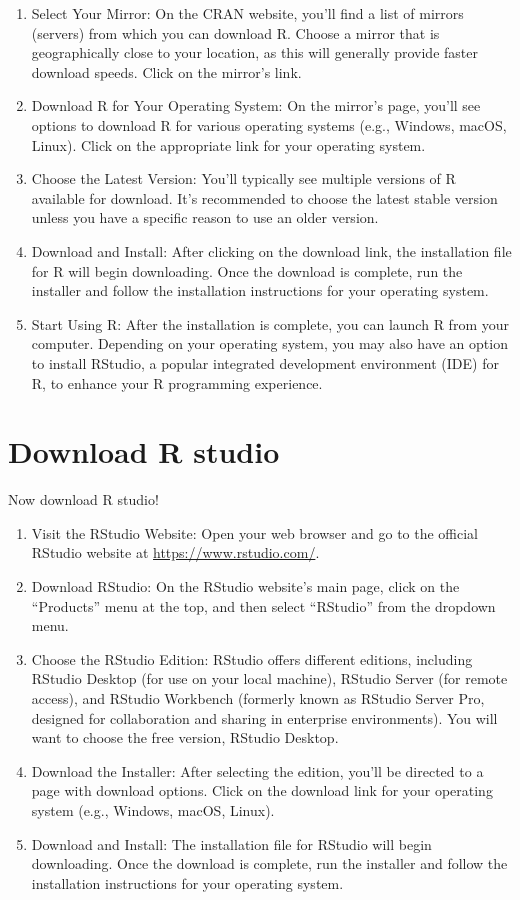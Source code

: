\documentclass[
]{book}
\begin{document}
\begin{enumerate}
\def\labelenumi{\arabic{enumi}.}
\item
  Select Your Mirror: On the CRAN website, you'll find a list of mirrors (servers) from which you can download R. Choose a mirror that is geographically close to your location, as this will generally provide faster download speeds. Click on the mirror's link.
\item
  Download R for Your Operating System: On the mirror's page, you'll see options to download R for various operating systems (e.g., Windows, macOS, Linux). Click on the appropriate link for your operating system.
\item
  Choose the Latest Version: You'll typically see multiple versions of R available for download. It's recommended to choose the latest stable version unless you have a specific reason to use an older version.
\item
  Download and Install: After clicking on the download link, the installation file for R will begin downloading. Once the download is complete, run the installer and follow the installation instructions for your operating system.
\item
  Start Using R: After the installation is complete, you can launch R from your computer. Depending on your operating system, you may also have an option to install RStudio, a popular integrated development environment (IDE) for R, to enhance your R programming experience.
\end{enumerate}

\hypertarget{download-r-studio}{%
\section{Download R studio}\label{download-r-studio}}

Now download R studio!

\begin{enumerate}
\def\labelenumi{\arabic{enumi}.}
\item
  Visit the RStudio Website: Open your web browser and go to the official RStudio website at \url{https://www.rstudio.com/}.
\item
  Download RStudio: On the RStudio website's main page, click on the ``Products'' menu at the top, and then select ``RStudio'' from the dropdown menu.
\item
  Choose the RStudio Edition: RStudio offers different editions, including RStudio Desktop (for use on your local machine), RStudio Server (for remote access), and RStudio Workbench (formerly known as RStudio Server Pro, designed for collaboration and sharing in enterprise environments). You will want to choose the free version, RStudio Desktop.
\item
  Download the Installer: After selecting the edition, you'll be directed to a page with download options. Click on the download link for your operating system (e.g., Windows, macOS, Linux).
\item
  Download and Install: The installation file for RStudio will begin downloading. Once the download is complete, run the installer and follow the installation instructions for your operating system.
\end{enumerate}
\end{document}
